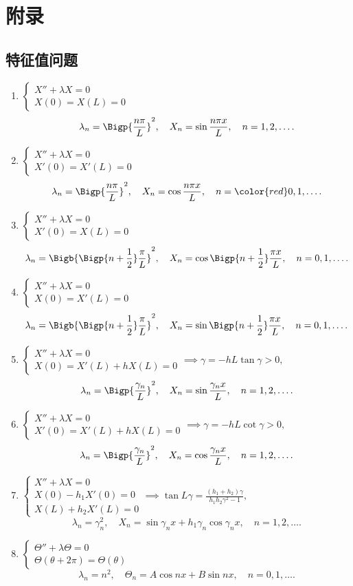 \chapter{附录}
\section{特征值问题}
\begin{enumerate}
	\item $\begin{cases}
		X''+\lambda X=0\\
		X(0)=X(L)=0
	\end{cases}$
	\[\lambda_n=\Bigp{\frac{n\pi}L}^2,\quad X_n=\sin\frac{n\pi x}L,\quad n=1,2,\ldots.\]
	\item $\begin{cases}
		X''+\lambda X=0\\
		X'(0)=X'(L)=0
	\end{cases}$
	\[\lambda_n=\Bigp{\frac{n\pi}L}^2,\quad X_n=\cos\frac{n\pi x}L,\quad n={\color{red}0},1,\ldots.\]
	\item $\begin{cases}
		X''+\lambda X=0\\
		X'(0)=X(L)=0
	\end{cases}$
	\[\lambda_n=\Bigb{\Bigp{n+\frac12}\frac{\pi}L}^2,\quad X_n=\cos\Bigp{n+\frac12}\frac{\pi x}L,\quad n=0,1,\ldots.\]
	\item $\begin{cases}
		X''+\lambda X=0\\
		X(0)=X'(L)=0
	\end{cases}$
	\[\lambda_n=\Bigb{\Bigp{n+\frac12}\frac{\pi}L}^2,\quad X_n=\sin\Bigp{n+\frac12}\frac{\pi x}L,\quad n=0,1,\ldots.\]
	\item $\begin{cases}
		X''+\lambda X=0\\
		X(0)=X'(L)+hX(L)=0
	\end{cases}\implies \gamma=-hL\tan\gamma>0,$
	\[\lambda_n=\Bigp{\frac{\gamma_n}L}^2,\quad X_n=\sin\frac{\gamma_n x}L,\quad n=1,2,\ldots.\]
	\item $\begin{cases}
		X''+\lambda X=0\\
		X'(0)=X'(L)+hX(L)=0
	\end{cases}\implies \gamma=-hL\cot\gamma>0,$
	\[\lambda_n=\Bigp{\frac{\gamma_n}L}^2,\quad X_n=\cos\frac{\gamma_n x}L,\quad n=1,2,\ldots.\]
	\item $\begin{cases}
		X''+\lambda X=0\\
		X(0)-h_1X'(0)=0\\
		X(L)+h_2X'(L)=0
	\end{cases}\implies\tan L\gamma=\frac{(h_1+h_2)\gamma}{h_1h_2\gamma^2-1},$
	\[\lambda_n=\gamma_n^2,\quad X_n=\sin\gamma_n x+h_1\gamma_n\cos\gamma_nx,\quad n=1,2,\ldots.\]
	\item $\begin{cases}
		\varTheta''+\lambda\varTheta=0\\
		\varTheta(\theta+2\pi)=\varTheta(\theta)
	\end{cases}$
	\[\lambda_n=n^2,\quad\varTheta_n=A\cos nx+B\sin nx,\quad n=0,1,\ldots.\]
\end{enumerate}

